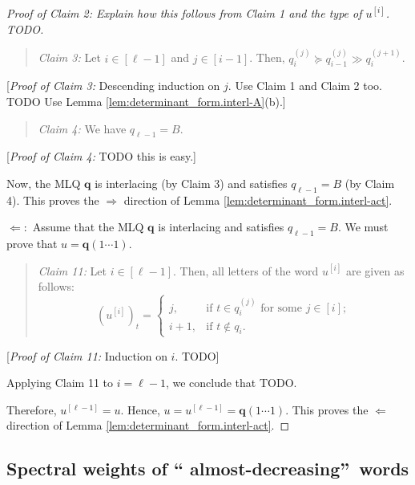 \documentclass[reqno]{amsart}
\newcommand{\0}{\phantom{c}}
\newenvironment{statement}{\begin{quote}}{\end{quote}}
\theoremstyle{plain}
\theoremstyle{definition}
\numberwithin{equation}{section}
\begin{document}
\begin{proof}
[\textit{Proof of Claim 2:} Explain how this follows from Claim 1 and the type
of $u^{\left[  i\right]  }$. TODO]

\begin{statement}
\textit{Claim 3:} Let $i\in\left[  \ell-1\right]  $ and $j\in\left[
i-1\right]  $. Then, $q_{i}^{\left(  j\right)  }\succeq q_{i-1}^{\left(
j\right)  }\gg q_{i}^{\left(  j+1\right)  }$.
\end{statement}

[\textit{Proof of Claim 3:} Descending induction on $j$. Use Claim 1 and Claim
2 too. TODO Use Lemma \ref{lem:determinant_form.interl-A}(b).]

\begin{statement}
\textit{Claim 4:} We have $q_{\ell-1}=B$.
\end{statement}

[\textit{Proof of Claim 4:} TODO this is easy.]

Now, the MLQ $\mathbf{q}$ is interlacing (by Claim 3) and satisfies
$q_{\ell-1}=B$ (by Claim 4). This proves the $\Longrightarrow$ direction of
Lemma \ref{lem:determinant_form.interl-act}.

$\Longleftarrow:$ Assume that the MLQ $\mathbf{q}$ is interlacing and
satisfies $q_{\ell-1}=B$. We must prove that $u=\mathbf{q}\left(
1\cdots1\right)  $.

\begin{statement}
\textit{Claim 11:} Let $i\in\left[  \ell-1\right]  $. Then, all letters of the
word $u^{\left[  i\right]  }$ are given as follows:%
\[
\left(  u^{\left[  i\right]  }\right)  _{t}=%
\begin{cases}
j, & \text{if }t\in q_{i}^{\left(  j\right)  }\text{ for some }j\in\left[
i\right]  ;\\
i+1, & \text{if }t\notin q_{i}.
\end{cases}
\]

\end{statement}

[\textit{Proof of Claim 11:} Induction on $i$. TODO]

Applying Claim 11 to $i=\ell-1$, we conclude that TODO.

Therefore, $u^{\left[  \ell-1\right]  }=u$. Hence, $u=u^{\left[
\ell-1\right]  }=\mathbf{q}\left(  1\cdots1\right)  $. This proves the
$\Longleftarrow$ direction of Lemma \ref{lem:determinant_form.interl-act}.
\end{proof}

\subsection{Spectral weights of \textquotedblleft
almost-decreasing\textquotedblright\ words}
\end{document}
